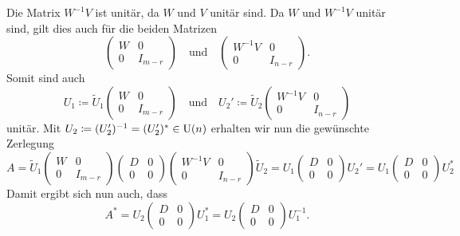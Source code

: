Die Matrix $W^{-1} V$ ist unitär, da $W$ und $V$ unitär sind.
Da $W$ und $W^{-1} V$ unitär sind, gilt dies auch für die beiden Matrizen
\[
  \begin{pmatrix}
    W & 0       \\
    0 & I_{m-r}
  \end{pmatrix}
  \quad\text{und}\quad
  \begin{pmatrix}
    W^{-1} V  & 0       \\
    0         & I_{n-r}
  \end{pmatrix}.
\]
Somit sind auch
\[
            U_1
  \coloneqq \tilde{U}_1
            \begin{pmatrix}
              W & 0       \\
              0 & I_{m-r}
            \end{pmatrix}
  \quad
  \text{und}
  \quad
            U_2'
  \coloneqq \tilde{U}_2
            \begin{pmatrix}
              W^{-1} V  & 0       \\
              0         & I_{n-r}
            \end{pmatrix}
\]
unitär.
Mit $U_2 \coloneqq (U_2')^{-1} = (U_2')^* \in \operatorname{U}(n)$ erhalten wir nun die gewünschte Zerlegung
\[
    A
  = \tilde{U}_1
    \begin{pmatrix}
      W & 0       \\
      0 & I_{m-r}
    \end{pmatrix}
    \begin{pmatrix}
      D & 0 \\
      0 & 0
    \end{pmatrix}
    \begin{pmatrix}
      W^{-1} V  & 0       \\
      0         & I_{n-r}
    \end{pmatrix}
    \tilde{U}_2
  = U_1
    \begin{pmatrix}
      D & 0 \\
      0 & 0
    \end{pmatrix}
    U_2'
  = U_1
    \begin{pmatrix}
      D & 0 \\
      0 & 0
    \end{pmatrix}
    U_2^*
\]
Damit ergibt sich nun auch, dass
\[
    A^*
  = U_2
    \begin{pmatrix}
      D & 0 \\
      0 & 0
    \end{pmatrix}
    U_1^*
  = U_2
    \begin{pmatrix}
      D & 0 \\
      0 & 0
    \end{pmatrix}
    U_1^{-1}.
\]
